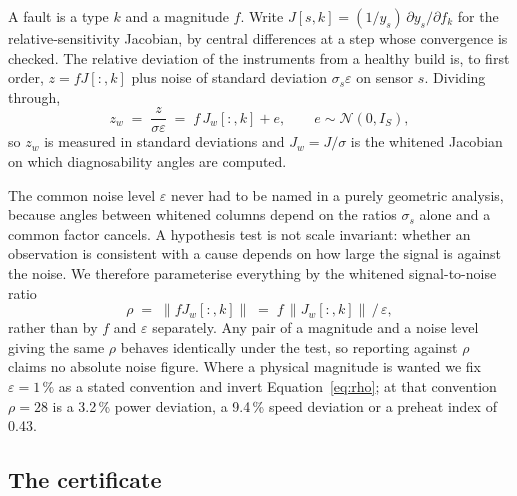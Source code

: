 \documentclass[preprint,12pt]{elsarticle}
\begin{document}
A fault is a type $k$ and a magnitude $f$. Write
$J[s,k] = (1/y_s)\,\partial y_s/\partial f_k$ for the relative-sensitivity
Jacobian, by central differences at a step whose convergence is checked. The
relative deviation of the instruments from a healthy build is, to first order,
$z = f J[:,k]$ plus noise of standard deviation $\sigma_s \varepsilon$ on
sensor $s$. Dividing through,
%
\begin{equation}
z_w \;=\; \frac{z}{\sigma \varepsilon} \;=\; f\,J_w[:,k] + e,
\qquad e \sim \mathcal{N}(0, I_S),
\label{eq:obs}
\end{equation}
%
so $z_w$ is measured in standard deviations and $J_w = J/\sigma$ is the whitened
Jacobian on which diagnosability angles are computed.

The common noise level $\varepsilon$ never had to be named in a purely
geometric analysis, because angles between whitened columns depend on the ratios
$\sigma_s$ alone and a common factor cancels. A hypothesis test is not scale
invariant: whether an observation is consistent with a cause depends on how
large the signal is against the noise. We therefore parameterise everything by
the whitened signal-to-noise ratio
%
\begin{equation}
\rho \;=\; \|f J_w[:,k]\| \;=\; f\,\|J_w[:,k]\| \,/\, \varepsilon ,
\label{eq:rho}
\end{equation}
%
rather than by $f$ and $\varepsilon$ separately. Any pair of a magnitude and a
noise level giving the same $\rho$ behaves identically under the test, so
reporting against $\rho$ claims no absolute noise figure. Where a physical
magnitude is wanted we fix $\varepsilon = 1\,\%$ as a stated convention and
invert Equation~\eqref{eq:rho}; at that convention $\rho = 28$ is a 3.2\,\%
power deviation, a 9.4\,\% speed deviation or a preheat index of 0.43.

\subsection{The certificate}
\label{sec:test}
\end{document}
